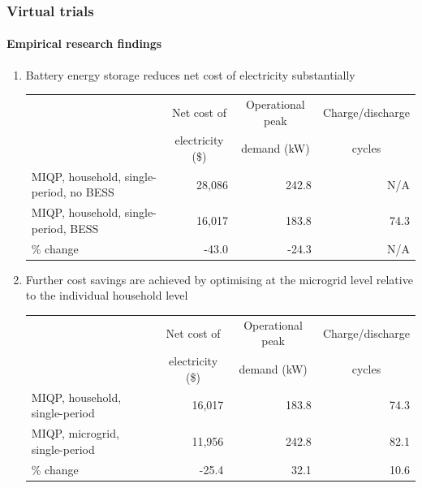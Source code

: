 \documentclass[handout, smaller, xcolor=table]{beamer}			%
\newcounter{enumcount}
\begin{document}
\begin{frame}
	\frametitle{Virtual trials}
	\framesubtitle{Empirical research findings}

	\begin{enumerate}
		\item  Battery energy storage reduces net cost of electricity substantially
			\vspace{-0.5em}
			\begin{table}[!h]
			\centering
			{\scriptsize
			\begin{tabular}{l r r r}
				\toprule
				& \multicolumn{1}{c}{Net cost of}	& \multicolumn{1}{c}{Operational peak}	& \multicolumn{1}{c}{Charge/discharge}	\\
				& \multicolumn{1}{c}{	electricity (\$)} 	& \multicolumn{1}{c}{demand (kW)}		&\multicolumn{1}{c}{cycles}	\\
				\midrule
				MIQP, household, single-period, no BESS	& 28,086	& 242.8	& N/A	\\
				MIQP, household, single-period, BESS	& 16,017	& 183.8	& 74.3	\\
				\midrule
				\% change	& -43.0	& -24.3	& N/A	\\
				\bottomrule
			\end{tabular}
			}
			\end{table}
		
		
		\item  Further cost savings are achieved by optimising at the microgrid level relative to the individual household level
			\vspace{0.5em}
			\begin{table}[!h]
			\centering
			{\scriptsize
			\begin{tabular}{l r r r}
				\toprule
				& \multicolumn{1}{c}{Net cost of}	& \multicolumn{1}{c}{Operational peak}	& \multicolumn{1}{c}{Charge/discharge}	\\
				& \multicolumn{1}{c}{	electricity (\$)} 	& \multicolumn{1}{c}{demand (kW)}		&\multicolumn{1}{c}{cycles}	\\
				\midrule
				MIQP, household, single-period		& 16,017	& 183.8	& 74.3	\\
				MIQP, microgrid, single-period		& 11,956	& 242.8	& 82.1	\\
				\midrule
				\% change	& -25.4	& 32.1	& 10.6	\\
				\bottomrule
			\end{tabular}
			}
			\end{table}
			
		\setcounter{enumcount}{\value{enumi}}
	\end{enumerate}

\end{frame}
\end{document}
